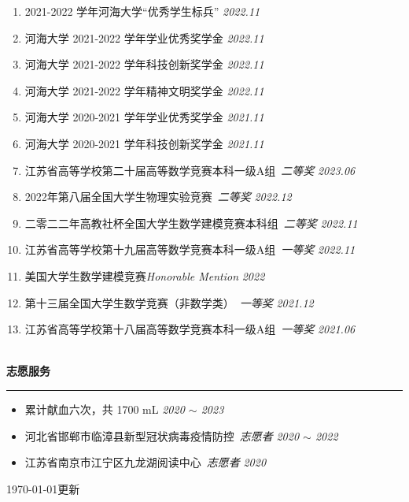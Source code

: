 \documentclass[12pt]{article}
\renewcommand*{\section}[1]{
    ~\\ \noindent \textbf{#1} \medskip \hrule \medskip
}
\begin{document}
\begin{enumerate}
    \item 2021-2022 学年河海大学“优秀学生标兵” \hfill \textit{2022.11}
    \item 河海大学 2021-2022 学年学业优秀奖学金 \hfill \textit{2022.11}
    \item 河海大学 2021-2022 学年科技创新奖学金 \hfill \textit{2022.11}
    \item 河海大学 2021-2022 学年精神文明奖学金 \hfill \textit{2022.11}
    \item 河海大学 2020-2021 学年学业优秀奖学金 \hfill \textit{2021.11}
    \item 河海大学 2020-2021 学年科技创新奖学金 \hfill \textit{2021.11}
          \\
    \item 江苏省高等学校第二十届高等数学竞赛本科一级A组\ \textit{二等奖} \hfill \textit{2023.06}
    \item 2022年第八届全国大学生物理实验竞赛\ \textit{二等奖} \hfill \textit{2022.12}
    \item 二零二二年高教社杯全国大学生数学建模竞赛本科组\ \textit{二等奖} \hfill \textit{2022.11}
    \item 江苏省高等学校第十九届高等数学竞赛本科一级A组\ \textit{一等奖} \hfill \textit{2022.11}
    \item 美国大学生数学建模竞赛\textit{Honorable Mention} \hfill \textit{2022}
    \item 第十三届全国大学生数学竞赛（非数学类）\ \textit{一等奖} \hfill \textit{2021.12}
    \item 江苏省高等学校第十八届高等数学竞赛本科一级A组\ \textit{一等奖} \hfill \textit{2021.06}
\end{enumerate}


\section{志愿服务}

\begin{itemize}
    \item 累计献血六次，共 1700 mL \hfill \textit{2020 $\sim$ 2023}
    \item 河北省邯郸市临漳县新型冠状病毒疫情防控\ \textit{志愿者} \hfill \textit{2020 $\sim$ 2022}
    \item 江苏省南京市江宁区九龙湖阅读中心\ \textit{志愿者} \hfill \textit{2020}
\end{itemize}

\hfill {\tiny \today 更新}
\end{document}
